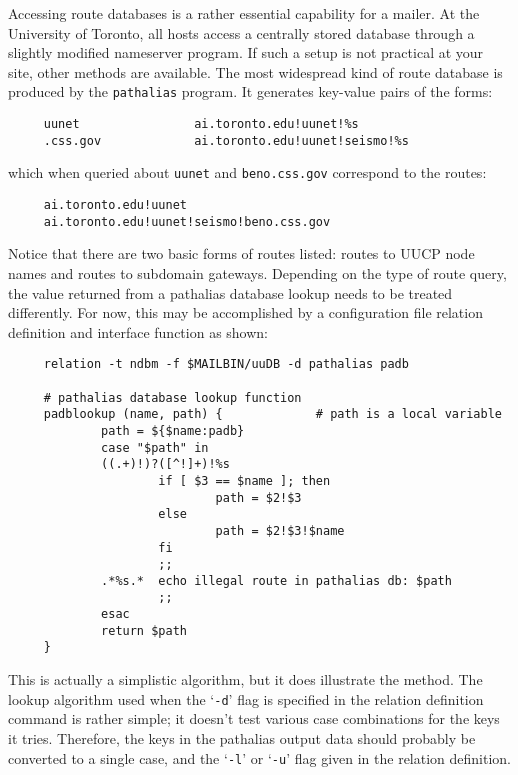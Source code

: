 Accessing route databases is a rather essential capability for a mailer.
At the University of Toronto, all hosts access a centrally stored database
through a slightly modified nameserver program.  If such a setup is not
practical at your site, other methods are available.  The most widespread
kind of route database is produced by the {\tt pathalias} program.  It
generates key-value pairs of the forms:

\begin{verbatim}
     uunet                ai.toronto.edu!uunet!%s
     .css.gov             ai.toronto.edu!uunet!seismo!%s
\end{verbatim}


which when queried about {\tt uunet} and {\tt beno.css.gov} correspond to 
the routes:

\begin{verbatim}
     ai.toronto.edu!uunet
     ai.toronto.edu!uunet!seismo!beno.css.gov
\end{verbatim}

Notice that there are two basic forms of routes listed: routes to UUCP node
names and routes to subdomain gateways.  Depending on the type of route
query, the value returned from a pathalias database lookup needs to be
treated differently.  For now, this may be accomplished by a configuration
file relation definition and interface function as shown:

\begin{verbatim}
     relation -t ndbm -f $MAILBIN/uuDB -d pathalias padb
     
     # pathalias database lookup function
     padblookup (name, path) {             # path is a local variable
             path = ${$name:padb}
             case "$path" in
             ((.+)!)?([^!]+)!%s
                     if [ $3 == $name ]; then
                             path = $2!$3
                     else
                             path = $2!$3!$name
                     fi
                     ;;
             .*%s.*  echo illegal route in pathalias db: $path
                     ;;
             esac
             return $path
     }
\end{verbatim}

This is actually a simplistic algorithm, but it does illustrate the method.
The lookup algorithm used when the `{\tt -d}' flag is specified in the
relation definition command is rather simple; it doesn't test various case
combinations for the keys it tries.  Therefore, the keys in the pathalias
output data should probably be converted to a single case, and the `{\tt -l}'
or `{\tt -u}' flag given in the relation definition.






